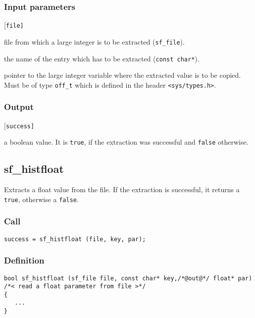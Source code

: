 \subsubsection*{Input parameters}
\begin{desclist}{\tt }{\quad}[\tt file]
   \setlength\itemsep{0pt}
   \item[file] file from which a large integer is to be extracted (\texttt{sf\_file}).
   \item[key]  the name of the entry which has to be extracted (\texttt{const char*}).
   \item[par]  pointer to the large integer variable where the extracted value is to be copied. Must be of type \texttt{off\_t} which is defined in the header \texttt{<sys/types.h>}.
\end{desclist}

\subsubsection*{Output}
\begin{desclist}{\tt }{\quad}[\tt success]
   \setlength\itemsep{0pt}
   \item[success] a boolean value. It is \texttt{true}, if the extraction was successful and \texttt{false} otherwise.
\end{desclist}




\subsection{{sf\_histfloat}}
Extracts a float value from the file. If the extraction is successful, it returns a \texttt{true}, otherwise a \texttt{false}. 

\subsubsection*{Call}
\begin{verbatim}success = sf_histfloat (file, key, par);\end{verbatim}

\subsubsection*{Definition}
\begin{verbatim}
bool sf_histfloat (sf_file file, const char* key,/*@out@*/ float* par) 
/*< read a float parameter from file >*/
{
   ...
}
\end{verbatim}

